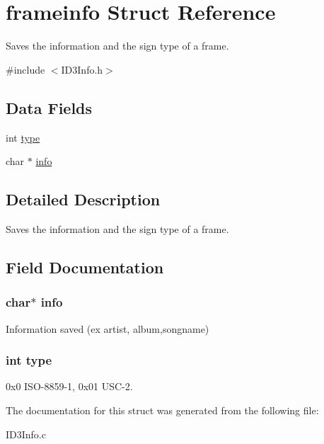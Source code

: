 \hypertarget{structframeinfo}{\section{frameinfo Struct Reference}
\label{structframeinfo}
}


Saves the information and the sign type of a frame.  




{\ttfamily \#include $<$I\-D3\-Info.\-h$>$}

\subsection*{Data Fields}
\begin{DoxyCompactItemize}
\item 
int \hyperlink{structframeinfo_ac765329451135abec74c45e1897abf26}{type}
\item 
char $\ast$ \hyperlink{structframeinfo_a65627378647d3a125ae55432f3f569e2}{info}
\end{DoxyCompactItemize}


\subsection{Detailed Description}
Saves the information and the sign type of a frame. 

\subsection{Field Documentation}
\hypertarget{structframeinfo_a65627378647d3a125ae55432f3f569e2}{
\subsubsection[{info}]{\setlength{\rightskip}{0pt plus 5cm}char$\ast$ info}}\label{structframeinfo_a65627378647d3a125ae55432f3f569e2}
Information saved (ex artist, album,songname) \hypertarget{structframeinfo_ac765329451135abec74c45e1897abf26}{
\subsubsection[{type}]{\setlength{\rightskip}{0pt plus 5cm}int type}}\label{structframeinfo_ac765329451135abec74c45e1897abf26}
0x0 I\-S\-O-\/8859-\/1, 0x01 U\-S\-C-\/2. 

The documentation for this struct was generated from the following file\-:\begin{DoxyCompactItemize}
\item 
I\-D3\-Info.\-c\end{DoxyCompactItemize}

